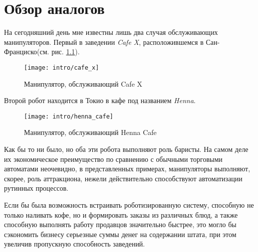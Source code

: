 \chapter{Обзор аналогов}\label{ch:0}

На сегодняшний день мне известны лишь два случая обслуживающих манипуляторов. Первый в заведении \textit{Cafe X}, расположившемся в Сан-Франциско(см. рис. \ref{fig:1_0}).
\begin{figure}[h!]
	\centering
	\texttt{[image: intro/cafe\_x]}
	\caption{Манипулятор, обслуживающий Cafe X}
	\label{fig:1_0}
\end{figure}

Второй робот находится в Токио в кафе под названием \textit{Henna}.
\begin{figure}[h!]
	\centering
	\texttt{[image: intro/henna\_cafe]}
	\caption{Манипулятор, обслуживающий Henna Cafe}
	\label{fig:1_1}
\end{figure}

Как бы то ни было, но оба эти робота выполняют роль баристы. На самом деле их экономическое преимущество по сравнению с обычными торговыми автоматами неочевидно, в представленных примерах, манипуляторы выполняют, скорее, роль аттракциона, нежели действительно способствуют автоматизации рутинных процессов.

Если бы была возможность встраивать роботизированную систему, способную не только наливать кофе, но и формировать заказы из различных блюд, а также способную выполнять работу продавцов значительно быстрее, это могло бы сэкономить бизнесу серьезные суммы денег на содержании штата, при этом увеличив пропускную способность заведений.